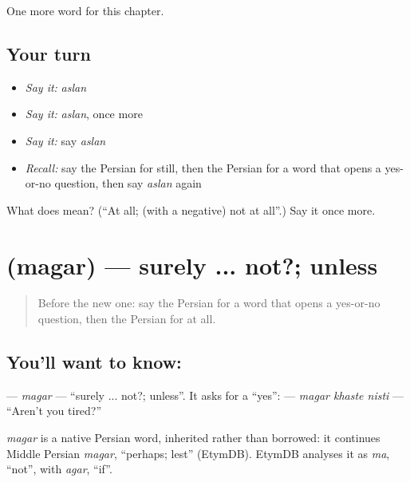 \begin{grammarlens}[title={What you've built}]
One more word for this chapter.
\end{grammarlens}

\subsection*{Your turn}
\begin{itemize}
\raggedright
  \item \emph{Say it:} \emph{aslan}
  \item \emph{Say it:} \emph{aslan}, once more
  \item \emph{Say it:} say \emph{aslan}
  \item \emph{Recall:} say the Persian for still, then the Persian for a word that opens a yes-or-no question, then say \emph{aslan} again
\end{itemize}

\begin{tcolorbox}[breakable,colback=teal!4,colframe=teal!35!black,title={Before you move on}]
What does  mean? (\textquotedblleft{}At all; (with a negative) not at all\textquotedblright{}.) Say it once more.
\end{tcolorbox}
\section[\texorpdfstring{\fa{مگر} (magar)}{مگر (magar)}]{ (magar) — surely ... not?; unless}

\label{lesson:FA-C136-magar}



\begin{quote}
Before the new one: say the Persian for a word that opens a yes-or-no question, then the Persian for at all.
\end{quote}

\subsection*{You'll want to know: }
\textbf{} — \emph{magar} — \textquotedblleft{}surely ... not?; unless\textquotedblright{}. It asks for a \textquotedblleft{}yes\textquotedblright{}: \textbf{  } — \emph{magar khaste nisti} — \textquotedblleft{}Aren't you tired?\textquotedblright{}

\begin{cousinweb}
\emph{magar} is a native Persian word, inherited rather than borrowed: it continues Middle Persian \emph{magar}, \textquotedblleft{}perhaps; lest\textquotedblright{} (EtymDB). EtymDB analyses it as \emph{ma}, \textquotedblleft{}not\textquotedblright{}, with \emph{agar}, \textquotedblleft{}if\textquotedblright{}.
\end{cousinweb}

